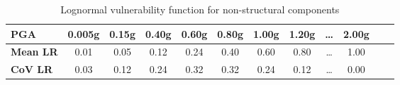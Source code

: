 \begin{table}[h]

\centering
\begin{tabular}{ l c c c c c c c c c c c}

\hline
\rowcolor{anti-flashwhite}
\bf{PGA} & \bf{0.005g} & \bf{0.15g} & \bf{0.40g} & \bf{0.60g} & \bf{0.80g} & \bf{1.00g} & \bf{1.20g} & \bf{\dots} & \bf{2.00g} \\
\hline
\bf{Mean LR} & 0.01 & 0.05 & 0.12 & 0.24 & 0.40 & 0.60 & 0.80 & \dots & 1.00 \\
\bf{CoV LR} & 0.03 & 0.12 & 0.24 & 0.32 & 0.32 & 0.24 & 0.12 & \dots & 0.00 \\
\hline
\end{tabular}

\caption{Lognormal vulnerability function for non-structural components}
\label{tab:vf-ln-tax1-nst}
\end{table}